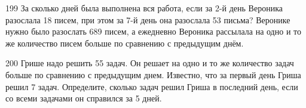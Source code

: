 \documentclass[4apaper]{article}
\begin{document}
\begin{taskBN}{199}
За сколько дней была выполнена вся работа, если за 2-й день Вероника разослала 18 писем, при этом за 7-й день она разослала 53 письма? Веронике нужно было разослать 689 писем, а ежедневно Вероника рассылала на одно и то же количество писем больше по сравнению с предыдущим днём. 
\end{taskBN}

\begin{taskBN}{200}
Грише надо решить 55 задач. Он решает на одно и то же количество задач больше по сравнению с предыдущим днем. Известно, что за первый день Гриша решил 7 задач. Определите, сколько задач решил Гриша в последний день, если со всеми задачами он справился за 5 дней.
\end{taskBN}
\end{document}
